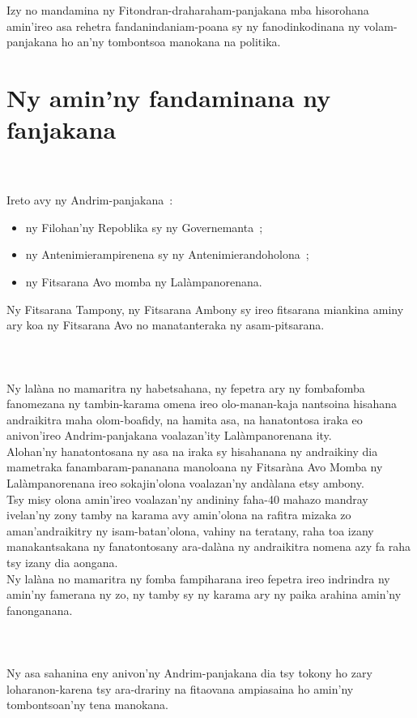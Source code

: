 \documentclass[12pt]{article}
\newcounter{laharana}
\newcommand{\andininy}[0]{
  \paragraph{%
    \NoCaseChange{%
      Andininy~\addtocounter{laharana}{1}\thelaharana.}\label{and:\thelaharana}~%
  }%
}
\begin{document}
\noindent
Izy no mandamina ny Fitondran-draharaham-panjakana mba hisorohana amin'ireo asa
rehetra fandanindaniam-poana sy ny fanodinkodinana ny volam-panjakana ho an'ny
tombontsoa manokana na politika.

\section{Ny amin'ny fandaminana ny fanjakana}
\label{sec:ny-aminny-fand}

\andininy{}Ireto avy ny Andrim-panjakana~:
\begin{itemize}
\item ny Filohan'ny Repoblika sy ny Governemanta~;
\item ny Antenimierampirenena sy ny Antenimierandoholona~;
\item ny Fitsarana Avo momba ny Lalàmpanorenana.
\end{itemize}

\noindent
Ny Fitsarana Tampony, ny Fitsarana Ambony sy ireo fitsarana miankina aminy ary
koa ny Fitsarana Avo no manatanteraka ny asam-pitsarana.


\andininy{}Ny lalàna no mamaritra ny habetsahana, ny fepetra ary ny fombafomba
fanomezana ny tambin-karama omena ireo olo-manan-kaja nantsoina hisahana
andraikitra maha olom-boafidy, na hamita asa, na hanatontosa iraka eo
anivon'ireo Andrim-panjakana voalazan'ity Lalàmpanorenana ity.\\

\noindent
Alohan'ny hanatontosana ny asa na iraka sy hisahanana ny andraikiny dia
mametraka fanambaram-pananana manoloana ny Fitsaràna Avo Momba ny
Lalàmpanorenana ireo sokajin'olona voalazan'ny andàlana etsy ambony.\\

\noindent
Tsy misy olona amin'ireo voalazan'ny andininy faha-40 mahazo mandray ivelan'ny
zony tamby na karama avy amin'olona na rafitra mizaka zo aman'andraikitry ny
isam-batan'olona, vahiny na teratany, raha toa izany manakantsakana ny
fanatontosany ara-dalàna ny andraikitra nomena azy fa raha tsy izany dia
aongana.\\

\noindent
Ny lalàna no mamaritra ny fomba fampiharana ireo fepetra ireo indrindra ny
amin'ny famerana ny zo, ny tamby sy ny karama ary ny paika arahina amin'ny
fanonganana.

\andininy{}Ny asa sahanina eny anivon'ny Andrim-panjakana dia tsy tokony ho zary
loharanon-karena tsy ara-drariny na fitaovana ampiasaina ho amin'ny
tombontsoan'ny tena manokana.
\end{document}
